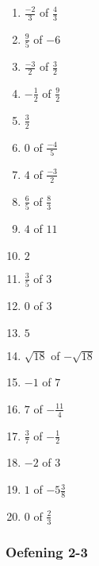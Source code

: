 {\begin{multicols}{3}

\begin{enumerate}[itemsep=1pt,  label=\textbf{\arabic*}. ] 
\item $\frac{-2}{3}$ of $\frac{4}{3}$%
\item $\frac{9}{5}$ of $-6$%
\item $\frac{-3}{2}$ of $\frac{3}{2}$%
\item $-\frac{1}{2}$ of $\frac{9}{2}$%
\item $\frac{3}{2}$%
\item $0$ of $\frac{-4}{5}$%
\item$4$ of $\frac{-3}{2}$ %
\item $\frac{6}{5}$ of $\frac{8}{3}$%
\item $4$ of $11$%
\item $2$%
\item $ \frac{3}{5}$ of $3$%
\item $0$ of $3$%
\item $5$%
\item $\sqrt{18}$ of $-\sqrt{18}$%
\item $-1$ of $7$%
\item $7$ of $-\frac{11}{4}$%
\item $\frac{3}{7}$ of $-\frac{1}{2}$%
\item $-2$ of $3$%
\item  $1$ of $-5\frac{3}{8}$%
\item  $0$ of $\frac{2}{3}$%
\end{enumerate}




\subsubsection*{Oefening 2-3} %

\begin{enumerate}[noitemsep, label=\textbf{\arabic*}. ] 


\end{enumerate}
\end{multicols}}
